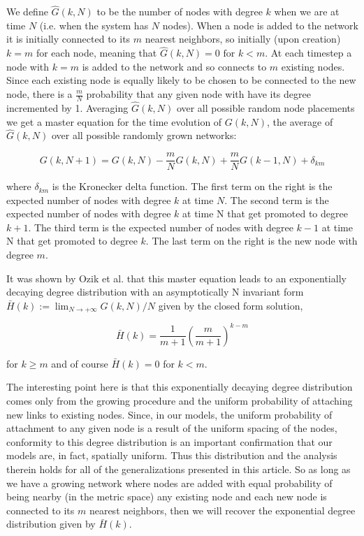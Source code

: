 \documentclass[aps,pre,reprint,superscriptaddress,amsmath,amssymb]{revtex4-1}
\begin{document}
We define $\hat{G}(k,N)$ to be the number of nodes with degree $k$ when we are at time $N$ (i.e. when the system has $N$ nodes).
When a node is added to the network it is initially connected to its $m$ nearest neighbors, so initially (upon creation) $k = m$ for each node, meaning that $\hat{G}(k,N) = 0 \text{ for } k < m$.
At each timestep a node with $k = m$ is added to the network and so connects to $m$ existing nodes.
Since each existing node is equally likely to be chosen to be connected to the new node, there is a $\frac{m}{N}$ probability that any given node with have its degree incremented by 1.
Averaging $\hat{G}(k,N)$ over all possible random node placements we get a master equation for the time evolution of $G(k,N)$, the average of $\hat{G}(k,N)$ over all possible randomly grown networks:

\[G(k,N+1) = G(k,N) - \frac{m}{N}G(k,N) + \frac{m}{N}G(k-1,N) + \delta_{km}\]

where $\delta_{km}$ is the Kronecker delta function.
The first term on the right is the expected number of nodes with degree $k$ at time $N$.
The second term is the expected number of nodes with degree $k$ at time N that get promoted to degree $k+1$.
The third term is the expected number of nodes with degree $k-1$ at time N that get promoted to degree $k$.
The last term on the right is the new node with degree $m$.

It was shown by Ozik et al. \cite{ozik2004} that this master equation leads to an exponentially decaying degree distribution with an asymptotically N invariant form $\bar{H}(k) := \lim_{N \to +\infty} G(k,N)/N$ given by the closed form solution,

\[\bar{H}(k) = \frac{1}{m+1}\left(\frac{m}{m+1}\right)^{k-m}\]

for $k \geq m$ and of course $\bar{H}(k) = 0$ for $k < m$.

The interesting point here is that this exponentially decaying degree distribution comes only from the growing procedure and the uniform probability of attaching new links to existing nodes.  Since, in our models, the uniform probability of attachment to any given node is a result of the uniform spacing of the nodes, conformity to this degree distribution is an important confirmation that our models are, in fact, spatially uniform.
Thus this distribution and the analysis therein holds for all of the generalizations presented in this article. 
So as long as we have a growing network where nodes are added with equal probability of being nearby (in the metric space) any existing node and each new node is connected to its $m$ nearest neighbors, then we will recover the exponential degree distribution given by $\bar{H}(k)$.
\end{document}
